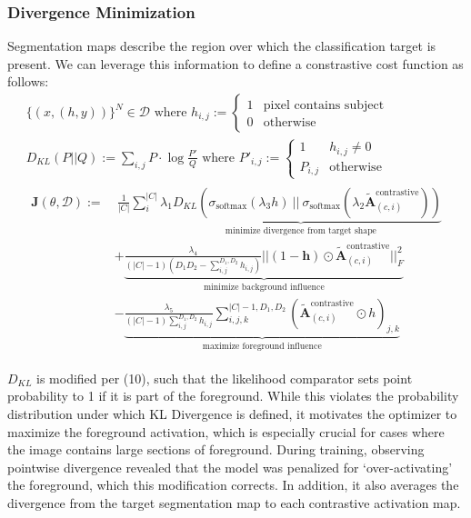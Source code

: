\documentclass{article}
\theoremstyle{plain}
\theoremstyle{definition}
\theoremstyle{remark}
\newcommand{\contcam}[2]{\tilde{\mathcal{\bm{A}}}^{\text{contrastive}}_{(#1, #2)}}
\begin{document}
\subsubsection{Divergence Minimization}
Segmentation maps describe the region over which the classification target is present. We can leverage this information to define a constrastive cost function as follows:
\begin{gather}
	\{(x, (h, y))\}^N \in \mathcal{D} \text{ where } h_{i,j} := \begin{cases}
		1 & \text{pixel contains subject} \\
		0 & \text{otherwise}
	\end{cases} \\
	D_{KL}(P || Q) := \sum_{i,j} P \cdot \log \frac{P'}{Q} \text{ where } 
	P'_{i,j} := \begin{cases}
		1 & h_{i,j} \neq 0 \\
		P_{i,j} & \text{otherwise}
	\end{cases} \label{d_kl} \\
	\begin{split}
		\mathcal{\bm{J}}(\theta, \mathcal{D}) := &\ \frac{1}{|C|} \sum^{|C|}_{i} \underbrace{\lambda_1 D_{KL}(\sigma_{\text{softmax}}(\lambda_3 h)\ ||\ \sigma_{\text{softmax}}(\lambda_2 \contcam{c}{i}))}_{\text{minimize divergence from target shape}} \\
		&+ \underbrace{\frac{\lambda_4}{(|C| - 1) \left(D_1 D_2 - \sum^{D_1,D_2}_{i,j}h_{i,j}\right)} || (1 - \bm{h}) \odot \contcam{c}{i}||^2_F}_{\text{minimize background influence}} \\
		&- \underbrace{\frac{\lambda_5}{(|C| - 1) \sum^{D_1,D_2}_{i,j}h_{i,j}} \sum^{|C|-1,D_1,D_2}_{i,j,k} \left(\contcam{c}{i} \odot h\right)_{j,k} }_{\text{maximize foreground influence}}
	\end{split}
\end{gather}

$D_{KL}$ is modified per (10), such that the likelihood comparator sets point probability to 1 if it is part of the foreground. While this violates the probability distribution under which KL Divergence is defined, it motivates the optimizer to maximize the foreground activation, which is especially crucial for cases where the image contains large sections of foreground. During training, observing pointwise divergence revealed that the model was penalized for `over-activating' the foreground, which this modification corrects. In addition, it also averages the divergence from the target segmentation map to each contrastive activation map.
\end{document}
